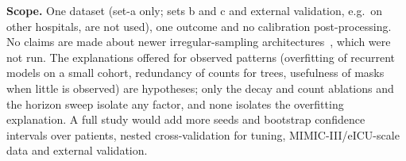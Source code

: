 \textbf{Scope.} One dataset (set-a only; sets b and c and external validation, e.g.\ on other hospitals, are not used), one outcome and no calibration post-processing. No claims are made about newer irregular-sampling architectures~\cite{shukla2019interpolation,horn2019set,rubanova2019latent,zhang2021graph,tipirneni2021self}, which were not run. The explanations offered for observed patterns (overfitting of recurrent models on a small cohort, redundancy of counts for trees, usefulness of masks when little is observed) are hypotheses; only the decay and count ablations and the horizon sweep isolate any factor, and none isolates the overfitting explanation. A full study would add more seeds and bootstrap confidence intervals over patients, nested cross-validation for tuning, MIMIC-III/eICU-scale data and external validation.
